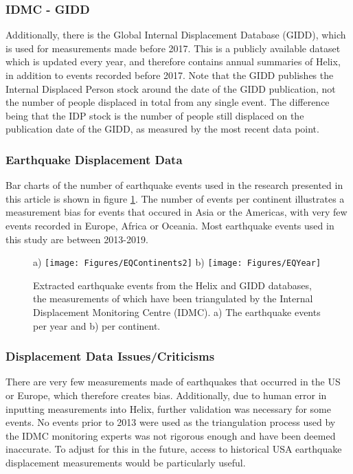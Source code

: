 \documentclass[10pt,a4paper]{article}
\begin{document}
\begin{multicols}{1}
\subsubsection{IDMC - GIDD}\label{sec:GIDD}
Additionally, there is the Global Internal Displacement Database (GIDD), which is used for measurements made before 2017. This is a publicly available dataset which is updated every year, and therefore contains annual summaries of Helix, in addition to events recorded before 2017. Note that the GIDD publishes the Internal Displaced Person stock around the date of the GIDD publication, not the number of people displaced in total from any single event. The difference being that the IDP stock is the number of people still displaced on the publication date of the GIDD, as measured by the most recent data point.
\subsubsection{Earthquake Displacement Data}\label{sec:dispvis}
Bar charts of the number of earthquake events used in the research presented in this article is shown in figure \ref{fig:HelixEQ}. The number of events per continent illustrates a measurement bias for events that occured in Asia or the Americas, with very few events recorded in Europe, Africa or Oceania. Most earthquake events used in this study are between 2013-2019.
\begin{figure}[H]
  a) \texttt{[image: Figures/EQContinents2]}
  b) \texttt{[image: Figures/EQYear]}
 	\caption{Extracted earthquake events from the Helix and GIDD databases, the measurements of which have been triangulated by the Internal Displacement Monitoring Centre (IDMC). a) The earthquake events per year and b) per continent.}
 	\label{fig:HelixEQ}
\end{figure}
\subsubsection{Displacement Data Issues/Criticisms}\label{sec:dispcrit}
There are very few measurements made of earthquakes that occurred in the US or Europe, which therefore creates bias. Additionally, due to human error in inputting measurements into Helix, further validation was necessary for some events. No events prior to 2013 were used as the triangulation process used by the IDMC monitoring experts was not rigorous enough and have been deemed inaccurate. To adjust for this in the future, access to historical USA earthquake displacement measurements would be particularly useful.

\end{multicols}
\end{document}

